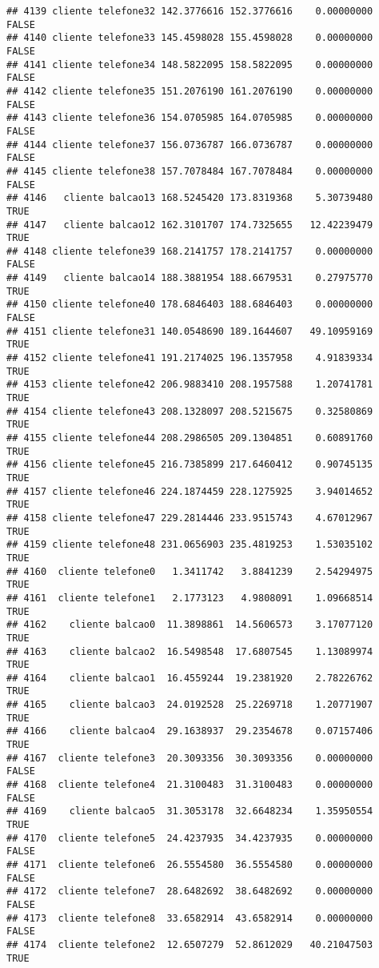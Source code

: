 \documentclass[
]{article}
\begin{document}
\begin{verbatim}
## 4139 cliente telefone32 142.3776616 152.3776616    0.00000000    FALSE
## 4140 cliente telefone33 145.4598028 155.4598028    0.00000000    FALSE
## 4141 cliente telefone34 148.5822095 158.5822095    0.00000000    FALSE
## 4142 cliente telefone35 151.2076190 161.2076190    0.00000000    FALSE
## 4143 cliente telefone36 154.0705985 164.0705985    0.00000000    FALSE
## 4144 cliente telefone37 156.0736787 166.0736787    0.00000000    FALSE
## 4145 cliente telefone38 157.7078484 167.7078484    0.00000000    FALSE
## 4146   cliente balcao13 168.5245420 173.8319368    5.30739480     TRUE
## 4147   cliente balcao12 162.3101707 174.7325655   12.42239479     TRUE
## 4148 cliente telefone39 168.2141757 178.2141757    0.00000000    FALSE
## 4149   cliente balcao14 188.3881954 188.6679531    0.27975770     TRUE
## 4150 cliente telefone40 178.6846403 188.6846403    0.00000000    FALSE
## 4151 cliente telefone31 140.0548690 189.1644607   49.10959169     TRUE
## 4152 cliente telefone41 191.2174025 196.1357958    4.91839334     TRUE
## 4153 cliente telefone42 206.9883410 208.1957588    1.20741781     TRUE
## 4154 cliente telefone43 208.1328097 208.5215675    0.32580869     TRUE
## 4155 cliente telefone44 208.2986505 209.1304851    0.60891760     TRUE
## 4156 cliente telefone45 216.7385899 217.6460412    0.90745135     TRUE
## 4157 cliente telefone46 224.1874459 228.1275925    3.94014652     TRUE
## 4158 cliente telefone47 229.2814446 233.9515743    4.67012967     TRUE
## 4159 cliente telefone48 231.0656903 235.4819253    1.53035102     TRUE
## 4160  cliente telefone0   1.3411742   3.8841239    2.54294975     TRUE
## 4161  cliente telefone1   2.1773123   4.9808091    1.09668514     TRUE
## 4162    cliente balcao0  11.3898861  14.5606573    3.17077120     TRUE
## 4163    cliente balcao2  16.5498548  17.6807545    1.13089974     TRUE
## 4164    cliente balcao1  16.4559244  19.2381920    2.78226762     TRUE
## 4165    cliente balcao3  24.0192528  25.2269718    1.20771907     TRUE
## 4166    cliente balcao4  29.1638937  29.2354678    0.07157406     TRUE
## 4167  cliente telefone3  20.3093356  30.3093356    0.00000000    FALSE
## 4168  cliente telefone4  21.3100483  31.3100483    0.00000000    FALSE
## 4169    cliente balcao5  31.3053178  32.6648234    1.35950554     TRUE
## 4170  cliente telefone5  24.4237935  34.4237935    0.00000000    FALSE
## 4171  cliente telefone6  26.5554580  36.5554580    0.00000000    FALSE
## 4172  cliente telefone7  28.6482692  38.6482692    0.00000000    FALSE
## 4173  cliente telefone8  33.6582914  43.6582914    0.00000000    FALSE
## 4174  cliente telefone2  12.6507279  52.8612029   40.21047503     TRUE

\end{verbatim}
\end{document}
